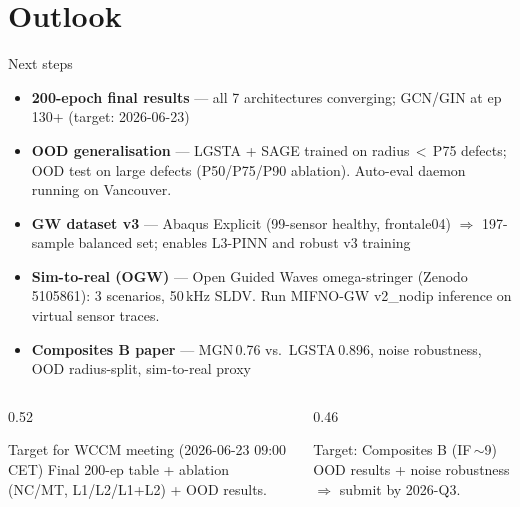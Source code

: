 \documentclass[aspectratio=169, 10pt]{beamer}
\begin{document}
\section{Outlook}

\begin{frame}{Next steps}
\begin{itemize}
  \item \textbf{200-epoch final results} — all 7 architectures converging; GCN/GIN at ep\,130+ (target: 2026-06-23)
  \item \textbf{OOD generalisation} — LGSTA + SAGE trained on radius\,$<$\,P75 defects; OOD test on large defects (P50/P75/P90 ablation). Auto-eval daemon running on Vancouver.
  \item \textbf{GW dataset v3} — Abaqus Explicit (99-sensor healthy, frontale04) $\Rightarrow$ 197-sample balanced set; enables L3-PINN and robust v3 training
  \item \textbf{Sim-to-real (OGW)} — Open Guided Waves omega-stringer (Zenodo 5105861): 3 scenarios, 50\,kHz SLDV. Run MIFNO-GW v2\_nodip inference on virtual sensor traces.
  \item \textbf{Composites B paper} — MGN\,0.76 vs.\ LGSTA\,0.896, noise robustness, OOD radius-split, sim-to-real proxy
\end{itemize}
\vspace{0.4em}
\begin{columns}[T]
\begin{column}{0.52\textwidth}
\begin{block}{Target for WCCM meeting (2026-06-23 09:00 CET)}
Final 200-ep table + ablation (NC/MT, L1/L2/L1+L2) + OOD results.
\end{block}
\end{column}
\begin{column}{0.46\textwidth}
\begin{block}{Target: Composites B (IF\,$\sim$9)}
OOD results + noise robustness $\Rightarrow$ submit by 2026-Q3.
\end{block}
\end{column}
\end{columns}
\end{frame}
\end{document}
